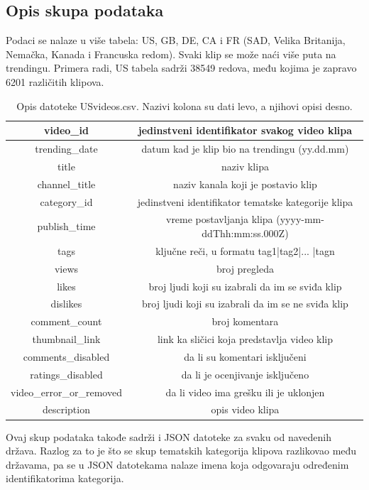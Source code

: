 \documentclass[a4paper]{article}
\theoremstyle{definition}
\begin{document}
\subsection{Opis skupa podataka}
Podaci se nalaze u više tabela: US, GB, DE,
CA i FR (SAD, Velika Britanija, Nemačka, Kanada i Francuska redom).
Svaki klip se može naći više puta na trendingu.
Primera radi, US tabela sadrži 38549 redova, među kojima je zapravo  6201 različitih klipova.


\begin{table}[H]
\centering
\begin{tabular}{ |c|c| }
 \hline
 video\_id & jedinstveni identifikator svakog video klipa  \\
\hline
 trending\_date & datum kad je klip bio na trendingu (yy.dd.mm)  \\
\hline
 title & naziv klipa  \\
\hline
 channel\_title & naziv kanala koji je postavio klip  \\
\hline
 category\_id & jedinstveni identifikator tematske kategorije klipa  \\
\hline
publish\_time & vreme postavljanja klipa (yyyy-mm-ddThh:mm:ss.000Z)\\
\hline
tags & ključne reči, u formatu tag1|tag2|... |tagn  \\
\hline
views & broj pregleda  \\
\hline
likes & broj ljudi koji su izabrali da im se sviđa klip\\
\hline
dislikes & broj ljudi koji su izabrali da im se ne sviđa klip   \\
\hline
comment\_count & broj komentara \\
\hline
thumbnail\_link & link ka sličici koja predstavlja video klip  \\
\hline
comments\_disabled & da li su komentari isključeni  \\
\hline
ratings\_disabled & da li je ocenjivanje isključeno \\
\hline
video\_error\_or\_removed & da li video ima grešku ili je uklonjen  \\
\hline
description & opis video klipa  \\
 \hline
\end{tabular}
\caption{Opis datoteke USvideos.csv. Nazivi kolona su dati levo, a njihovi opisi desno.}
\label{table:1}
\end{table}

Ovaj skup podataka takođe sadrži i JSON datoteke za svaku od navedenih država.
Razlog za to je što se skup tematskih kategorija klipova razlikovao među državama, pa se u JSON datotekama nalaze imena koja odgovaraju određenim identifikatorima kategorija.
\end{document}
